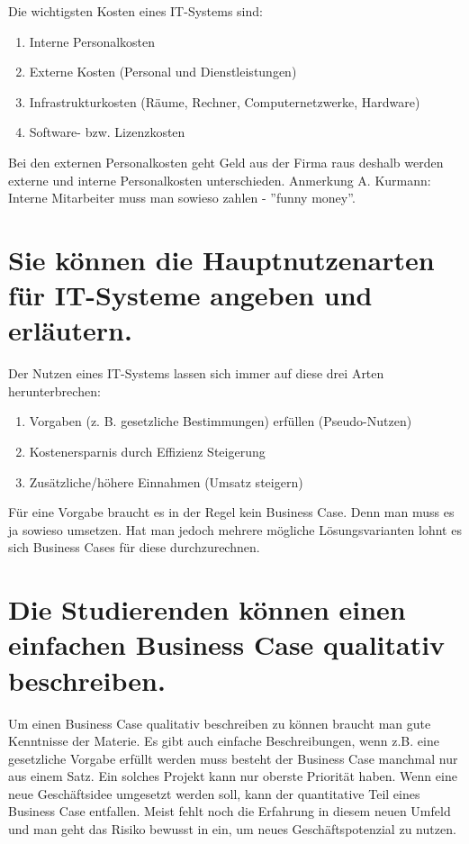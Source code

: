 Die wichtigsten Kosten eines IT-Systems sind:
\begin{enumerate}
	\item Interne Personalkosten
	\item Externe Kosten (Personal und Dienstleistungen)
	\item Infrastrukturkosten (Räume, Rechner, Computernetzwerke, Hardware)
	\item Software- bzw. Lizenzkosten
\end{enumerate}
Bei den externen Personalkosten geht Geld aus der Firma raus deshalb werden externe und interne Personalkosten unterschieden. Anmerkung A. Kurmann: Interne Mitarbeiter muss man sowieso zahlen - ''funny money''.

\section{Sie können die Hauptnutzenarten für IT-Systeme angeben und erläutern.}

Der Nutzen eines IT-Systems lassen sich immer auf diese drei Arten herunterbrechen:
\begin{enumerate}
	\item Vorgaben (z. B. gesetzliche Bestimmungen) erfüllen (Pseudo-Nutzen)
	\item Kostenersparnis durch Effizienz Steigerung
    \item Zusätzliche/höhere Einnahmen (Umsatz steigern)
\end{enumerate}

Für eine Vorgabe braucht es in der Regel kein Business Case. Denn man muss es ja sowieso umsetzen. Hat man jedoch mehrere mögliche Lösungsvarianten lohnt es sich Business Cases für diese durchzurechnen.

\section{Die Studierenden können einen einfachen Business Case qualitativ beschreiben.}

Um einen Business Case qualitativ beschreiben zu können braucht man gute Kenntnisse der Materie. Es gibt auch einfache Beschreibungen, wenn z.B. eine gesetzliche Vorgabe erfüllt werden muss besteht der Business Case manchmal nur aus einem Satz. Ein solches Projekt kann nur oberste Priorität haben.
Wenn eine neue Geschäftsidee umgesetzt werden soll, kann der quantitative Teil eines Business Case entfallen. Meist fehlt noch die Erfahrung in diesem neuen Umfeld und man geht das Risiko bewusst in ein, um neues Geschäftspotenzial zu nutzen.

